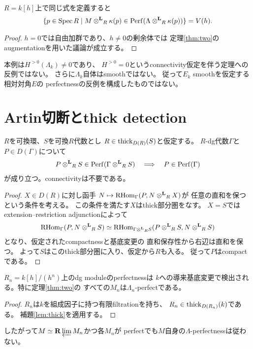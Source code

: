 \begin{corollary}
$R=k[h]$上で同じ式を定義すると
\[
\{p\in\operatorname{Spec} R\mid M\mathbin{\otimes^{\mathbf L}}_R\kappa(p)\in
\operatorname{Perf}(\Lambda\mathbin{\otimes^{\mathbf L}}_R\kappa(p))\}=V(h).
\]
\end{corollary}
\begin{proof}
$h=0$では自由加群であり、$h\ne0$の剰余体では
定理\ref{thm:two}のaugmentationを用いた議論が成立する。
\end{proof}
\begin{remark}
本例は$H^{>0}(\Lambda_k)\ne0$であり、
$H^{>0}=0$というconnectivity仮定を伴う定理への反例ではない。
さらに$\Lambda_k$自体はsmoothではない。
従って$E_k$ smoothを仮定する相対対角$E$の
perfectnessの反例を構成したものではない。
\end{remark}

\section{Artin切断とthick detection}
\begin{lemma}\label{lem:thick}
$R$を可換環、$S$を可換$R$代数とし
$R\in\operatorname{thick}_{D(R)}(S)$と仮定する。
$R$-dg代数$\Gamma$と$P\in D(\Gamma)$について
\[
P\mathbin{\otimes^{\mathbf L}}_RS\in\operatorname{Perf}(\Gamma\mathbin{\otimes^{\mathbf L}}_RS)
\quad\Longrightarrow\quad P\in\operatorname{Perf}(\Gamma)
\]
が成り立つ。connectivityは不要である。
\end{lemma}
\begin{proof}
$X\in D(R)$に対し函手
$N\mapsto\operatorname{RHom}_\Gamma(P,N\mathbin{\otimes^{\mathbf L}}_RX)$が
任意の直和を保つという条件を考える。
この条件を満たす$X$はthick部分圏をなす。
$X=S$ではextension--restriction adjunctionによって
\[
\operatorname{RHom}_\Gamma(P,N\mathbin{\otimes^{\mathbf L}}_RS)
\simeq \operatorname{RHom}_{\Gamma\mathbin{\otimes^{\mathbf L}}_RS}
(P\mathbin{\otimes^{\mathbf L}}_RS,N\mathbin{\otimes^{\mathbf L}}_RS)
\]
となり、仮定されたcompactnessと基底変更の
直和保存性から右辺は直和を保つ。
よって$S$はこのthick部分圏に入り、仮定から$R$も入る。
従って$P$はcompactである。
\end{proof}
\begin{corollary}\label{cor:artin}
$R_n=k[h]/(h^n)$上のdg moduleのperfectnessは
$k$への導来基底変更で検出される。特に定理\ref{thm:two}の
すべての$M_n$は$\Lambda_n$-perfectである。
\end{corollary}
\begin{proof}
$R_n$は$k$を組成因子に持つ有限filtrationを持ち、
$R_n\in\operatorname{thick}_{D(R_n)}(k)$である。
補題\ref{lem:thick}を適用する。
\end{proof}
したがって$M\simeq\mathbf R\varprojlim M_n$かつ各$M_n$が
perfectでも$M$自身の$\Lambda$-perfectnessは従わない。

